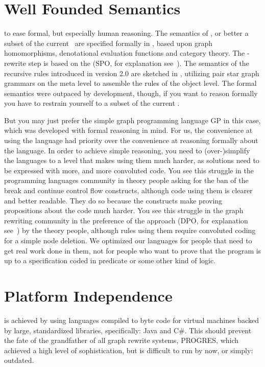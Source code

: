 \section{Well Founded Semantics}
to ease formal, but especially human reasoning.
The semantics of \GrG, or better a subset of the current \GrG\ are specified formally in \cite{DissRuby}, based upon graph homomorphisms, denotational evaluation functions and category theory.
The \GrG-rewrite step is based on the  (SPO, for explanation see~\cite{spoapproach}).
The semantics of the recursive rules introduced in version 2.0 are sketched in \cite{Jak:08},
utilizing pair star graph grammars on the meta level to assemble the rules of the object level.
The formal semantics were outpaced by development, though, if you want to reason formally you have to restrain yourself to a subset of the current \GrG.

But you may just prefer the simple graph programming language GP\cite{gp} in this case, which was developed with formal reasoning in mind.
For us, the convenience at using the language had priority over the convenience at reasoning formally about the language.
In order to achieve simple reasoning, you need to (over-)simplify the languages to a level that makes using them much harder, as solutions need to be expressed with more, and more convoluted code.
You see this struggle in the programming languages community in theory people asking for the ban of the break and continue control flow constructs, although code using them is clearer and better readable.
They do so because the constructs make proving propositions about the code much harder.
You see this struggle in the graph rewriting community in the preference of the  approach (DPO, for explanation see~\cite{dpoapproach}) by the theory people, although rules using them require convoluted coding for a simple node deletion.
We optimized our languages for people that need to get real work done in them, not for people who want to prove that the program is up to a specification coded in predicate or some other kind of logic. 

\section{Platform Independence}
is achieved by using languages compiled to byte code for virtual machines backed by large, standardized libraries, specifically: Java and C\#.
This should prevent the fate of the grandfather of all graph rewrite systems, PROGRES\cite{schuerr99progres},
which achieved a high level of sophistication, but is difficult to run by now, or simply: outdated.

